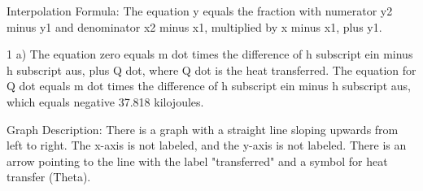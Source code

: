 Interpolation Formula:
The equation y equals the fraction with numerator y2 minus y1 and denominator x2 minus x1, multiplied by x minus x1, plus y1.

1 a)
The equation zero equals m dot times the difference of h subscript ein minus h subscript aus, plus Q dot, where Q dot is the heat transferred.
The equation for Q dot equals m dot times the difference of h subscript ein minus h subscript aus, which equals negative 37.818 kilojoules.

Graph Description:
There is a graph with a straight line sloping upwards from left to right. The x-axis is not labeled, and the y-axis is not labeled. There is an arrow pointing to the line with the label "transferred" and a symbol for heat transfer (Theta).